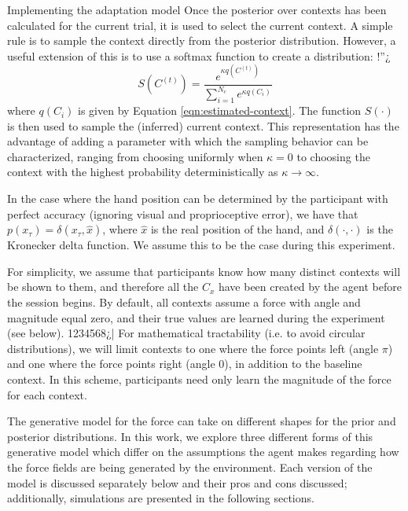 \documentclass{report}
\def \eref #1{Equation \ref{#1}}   %
\begin{document}
\begin{chapter}{Implementing the adaptation model}
Once the posterior over contexts has been calculated for the current trial, it
is used to select the current context. A simple rule is to sample the context
directly from the posterior distribution. However, a useful extension of this
is to use a softmax function to create a distribution:
 !''¿
\begin{equation}
S(C^{(t)}) = \frac{e^{\kappa
q\left(C^{(t)}\right)}}{\displaystyle \sum_{i=1}^{N_c}e^{\kappa
q\left(C_i\right)}}
\end{equation}
where $q(C_i)$ is given by \eref{eqn:estimated-context}. The
function $S(\cdot)$ is then used to sample the (inferred) current context. This
representation has the advantage of adding a parameter with which the sampling
behavior can be characterized, ranging from choosing uniformly when $\kappa =
0$ to choosing the context with the highest probability deterministically as
$\kappa \rightarrow \infty$.

In the case where the hand position can be determined by the participant with
perfect accuracy (ignoring visual and proprioceptive error), we have that
$p(x_\tau) = \delta(x_\tau, \hat x)$, where $\hat x$ is the real position of
the hand, and $\delta (\cdot, \cdot)$ is the Kronecker delta function. We
assume this to be the case during this experiment.

  For simplicity, we assume that participants know how many distinct contexts
will be shown to them, and therefore all the $C_x$ have been created by the
agent before the session begins. By default, all contexts assume a force with
angle and magnitude equal zero, and their true values are learned during the
experiment (see below).
1234568¿|
For mathematical tractability (i.e. to avoid circular distributions), we will
limit contexts to one where the force points left (angle $\pi$) and one where
the force points right (angle 0), in addition to the baseline context. In this
scheme, participants need only learn the magnitude of the force for each
context.

The generative model for the force can take on different shapes for the prior
and posterior distributions. In this work, we explore three different forms of
this generative model which differ on the assumptions the agent makes regarding
how the force fields are being generated by the environment. Each version of
the model is discussed separately below and their pros and cons discussed;
additionally, simulations are presented in the following sections.


\end{chapter}
\end{document}
